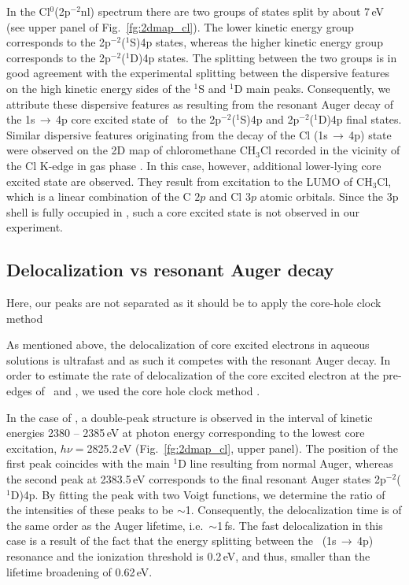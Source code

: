 In the Cl$^{0}$(2p$^{-2}$nl) spectrum there are two groups of states split by about 7\,eV (see upper panel of Fig.\ \ref{fg:2dmap_cl}). The lower kinetic energy group corresponds to the 2p$^{-2}$($^1$S)4p states, whereas the higher kinetic energy group corresponds to the 2p$^{-2}$($^1$D)4p states. The splitting between the two groups is in good agreement with the experimental splitting between the dispersive features on the high kinetic energy sides of the $^1$S and $^1$D main peaks. Consequently, we attribute these dispersive features as resulting from the resonant Auger decay of the 1s$\,\rightarrow\,$4p core excited state of \cli~to the 2p$^{-2}$($^1$S)4p and  2p$^{-2}$($^1$D)4p final states. Similar dispersive features originating from the decay of the Cl (1s$\,\rightarrow\,$4p) state were observed on the 2D map of chloromethane CH$_3$Cl recorded in the vicinity of the Cl K-edge in gas phase \cite{gold16:133001}. In this case, however, additional lower-lying core excited state are observed. They result from excitation to the LUMO of CH$_3$Cl, which is a linear combination of the C $2p$ and Cl $3p$ atomic orbitals. Since the 3p shell is fully occupied in \cli, such a core excited state is not observed in our experiment.


\subsection{Delocalization vs resonant Auger decay}

{\color{red}Here, our peaks are not separated as it should be to apply the core-hole clock method}

As mentioned above, the delocalization of core excited electrons in aqueous solutions is ultrafast and as such it competes with the resonant Auger decay. In order to estimate the rate of delocalization of the core excited electron at the pre-edges of \ki~and \cli, we used the core hole clock method \cite{bjorneholm92:1892,karis96:1380}.


In the case of \cli, a double-peak structure is observed in the interval of kinetic energies 2380 -- 2385\,eV at photon energy corresponding to the lowest core excitation, $h\nu = $2825.2\,eV (Fig.\ \ref{fg:2dmap_cl}, upper panel). The position of the first peak coincides with the main $^1$D line resulting from normal Auger, whereas the second peak at 2383.5\,eV corresponds to the final resonant Auger states 2p$^{-2}$($^1$D)4p. By fitting the peak with two Voigt functions, we determine the ratio of the intensities of these peaks to be $\sim$1. Consequently, the delocalization time is of the same order as the Auger lifetime, i.e.\ $\sim$1\,fs. The fast delocalization in this case is a result of the fact that the energy splitting between the \cli~(1s$\,\rightarrow\,$4p) resonance and the ionization threshold is 0.2\,eV, and thus, smaller than the lifetime broadening of 0.62\,eV.


